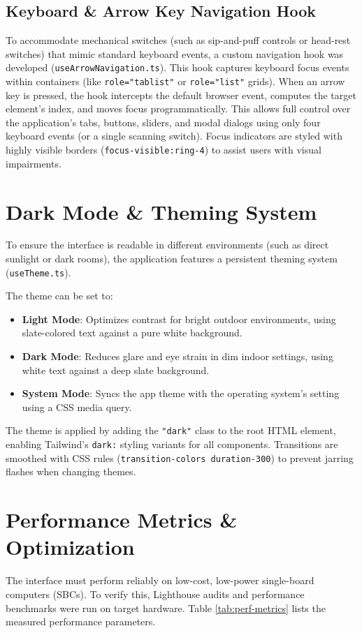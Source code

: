 \subsection{Keyboard \& Arrow Key Navigation Hook}
To accommodate mechanical switches (such as sip-and-puff controls or head-rest switches) that mimic standard keyboard events, a custom navigation hook was developed (\texttt{useArrowNavigation.ts}).
This hook captures keyboard focus events within containers (like \texttt{role="tablist"} or \texttt{role="list"} grids). When an arrow key is pressed, the hook intercepts the default browser event, computes the target element's index, and moves focus programmatically. This allows full control over the application's tabs, buttons, sliders, and modal dialogs using only four keyboard events (or a single scanning switch). Focus indicators are styled with highly visible borders (\texttt{focus-visible:ring-4}) to assist users with visual impairments.

\section{Dark Mode \& Theming System}
To ensure the interface is readable in different environments (such as direct sunlight or dark rooms), the application features a persistent theming system (\texttt{useTheme.ts}). 

The theme can be set to:
\begin{itemize}
    \item \textbf{Light Mode}: Optimizes contrast for bright outdoor environments, using slate-colored text against a pure white background.
    \item \textbf{Dark Mode}: Reduces glare and eye strain in dim indoor settings, using white text against a deep slate background.
    \item \textbf{System Mode}: Syncs the app theme with the operating system's setting using a CSS media query.
\end{itemize}

The theme is applied by adding the \texttt{"dark"} class to the root HTML element, enabling Tailwind's \texttt{dark:} styling variants for all components. Transitions are smoothed with CSS rules (\texttt{transition-colors duration-300}) to prevent jarring flashes when changing themes.



\section{Performance Metrics \& Optimization}
The interface must perform reliably on low-cost, low-power single-board computers (SBCs). To verify this, Lighthouse audits and performance benchmarks were run on target hardware. Table \ref{tab:perf-metrics} lists the measured performance parameters.

